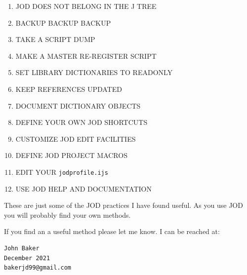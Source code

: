 \documentclass[11pt,letter,landscape]{article}
\begin{document}
\begin{enumerate}
\def\labelenumi{\arabic{enumi}.}
\item
  JOD DOES NOT BELONG IN THE J TREE
\item
  BACKUP BACKUP BACKUP
\item
  TAKE A SCRIPT DUMP
\item
  MAKE A MASTER RE-REGISTER SCRIPT
\item
  SET LIBRARY DICTIONARIES TO READONLY
\item
  KEEP REFERENCES UPDATED
\item
  DOCUMENT DICTIONARY OBJECTS
\item
  DEFINE YOUR OWN JOD SHORTCUTS
\item
  CUSTOMIZE JOD EDIT FACILITIES
\item
  DEFINE JOD PROJECT MACROS
\item
  EDIT YOUR \texttt{jodprofile.ijs}
\item
  USE JOD HELP AND DOCUMENTATION
\end{enumerate}

These are just some of the JOD practices I have found useful. As you use
JOD you will probably find your own methods.

If you find an a useful method please let me know. I can be reached at:

\begin{verbatim}
John Baker 
December 2021
bakerjd99@gmail.com
\end{verbatim}


    
    
    
\end{document}

